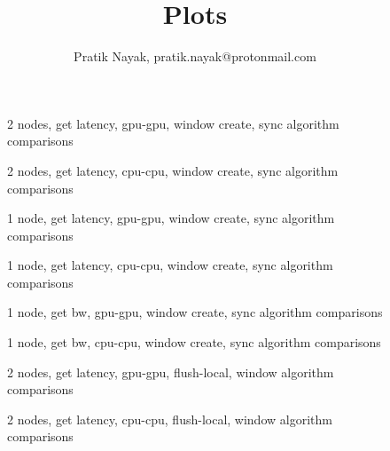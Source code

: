 \documentclass[]{article}
\title{Plots }
\author{Pratik Nayak, pratik.nayak@protonmail.com}
\begin{document}
\maketitle

\begin{abstract}

\end{abstract}


\begin{figure}
	
	\caption{2 nodes, get latency, gpu-gpu, window create, sync algorithm comparisons}
\end{figure}

\begin{figure}
	
	\caption{2 nodes, get latency, cpu-cpu, window create, sync algorithm comparisons}
\end{figure}

\begin{figure}
	
	\caption{1 node, get latency, gpu-gpu, window create, sync algorithm comparisons}
\end{figure}

\begin{figure}
	
	\caption{1 node, get latency, cpu-cpu, window create, sync algorithm comparisons}
\end{figure}

\begin{figure}
	
	\caption{1 node, get bw, gpu-gpu, window create, sync algorithm comparisons}
\end{figure}

\begin{figure}
	
	\caption{1 node, get bw, cpu-cpu, window create, sync algorithm comparisons}
\end{figure}

\begin{figure}
	
	\caption{2 nodes, get latency, gpu-gpu, flush-local, window algorithm comparisons}
\end{figure}

\begin{figure}
	
	\caption{2 nodes, get latency, cpu-cpu, flush-local, window algorithm comparisons}
\end{figure}
\end{document}
